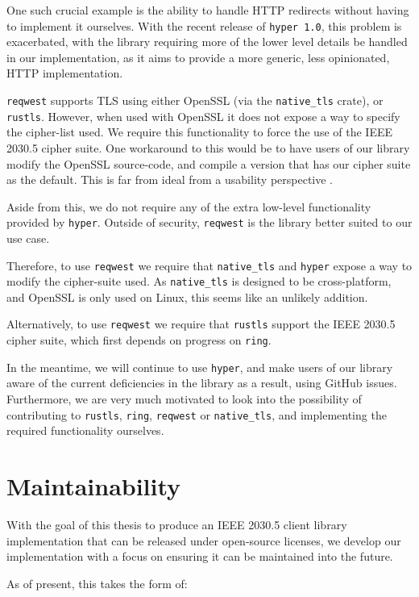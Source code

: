One such crucial example is the ability to handle HTTP redirects without having to implement it ourselves.
With the recent release of \texttt{hyper 1.0}, this problem is exacerbated, with the library requiring more of the lower level details be handled in our implementation, as it aims to provide a more generic, less opinionated, HTTP implementation.   

\texttt{reqwest} supports TLS using either OpenSSL (via the \texttt{native\_tls} crate), or \texttt{rustls}. However, when used with OpenSSL it does not expose a way to specify the cipher-list used. We require this functionality to force the use of the IEEE 2030.5 cipher suite. One workaround to this would be to have users of our library modify the OpenSSL source-code, and compile a version that has our cipher suite as the default. This is far from ideal from a usability perspective \cite{reqwestopenssl}.

Aside from this, we do not require any of the extra low-level functionality provided by \texttt{hyper}. Outside of security, \texttt{reqwest} is the library better suited to our use case.

Therefore, to use \texttt{reqwest} we require that \texttt{native\_tls} and \texttt{hyper} expose a way to modify the cipher-suite used. As \texttt{native\_tls} is designed to be cross-platform, and OpenSSL is only used on Linux, this seems like an unlikely addition.

Alternatively, to use \texttt{reqwest} we require that \texttt{rustls} support the IEEE 2030.5 cipher suite, which first depends on progress on \texttt{ring}.

In the meantime, we will continue to use \texttt{hyper}, and make users of our library aware of the current deficiencies in the library as a result, using GitHub issues.
Furthermore, we are very much motivated to look into the possibility of contributing to \texttt{rustls}, \texttt{ring}, \texttt{reqwest} or \texttt{native\_tls}, and implementing the required functionality ourselves.


\section{Maintainability}
With the goal of this thesis to produce an IEEE 2030.5 client library implementation that can be released under open-source licenses, we develop our implementation with a focus on ensuring it can be maintained into the future. 

As of present, this takes the form of:


